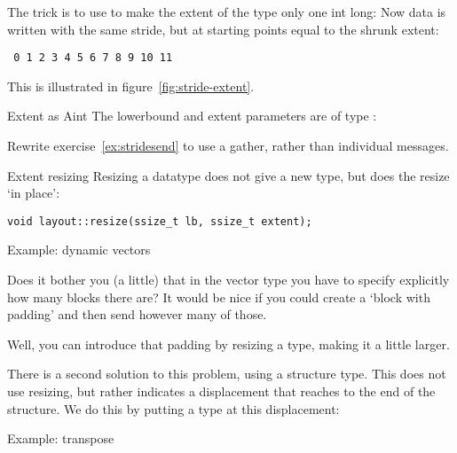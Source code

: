 The trick is to use 
to make the extent of the type only one int long:
%
%
Now data is written with the same stride, but
at starting points equal to the shrunk extent:
\begin{verbatim}
 0 1 2 3 4 5 6 7 8 9 10 11
\end{verbatim}

This is illustrated in figure~\ref{fig:stride-extent}.

\begin{fortrannote}{Extent as Aint}
  The lowerbound and extent parameters are of type
  :
\end{fortrannote}

\begin{exercise}[stridesend]
  \label{ex:stridesendsized}
  Rewrite exercise~\ref{ex:stridesend} to use a gather,
  rather than individual messages.
\end{exercise}

\begin{mplnote}{Extent resizing}
  Resizing a datatype does not give a new type, but
  does the resize `in place':
\begin{lstlisting}
void layout::resize(ssize_t lb, ssize_t extent);
\end{lstlisting}
\end{mplnote}

 {Example: dynamic vectors}

Does it bother you (a little) that in the vector type you
have to specify explicitly how many blocks there are?
It would be nice if you could create a `block with padding'
and then send however many of those.

Well, you can introduce that padding by resizing a type,
making it a little larger.


There is a second solution to this problem, using a structure type.
This does not use resizing, but rather indicates a displacement
that reaches to the end of the structure. We do this
by putting a type  at this displacement:


 {Example: transpose}

